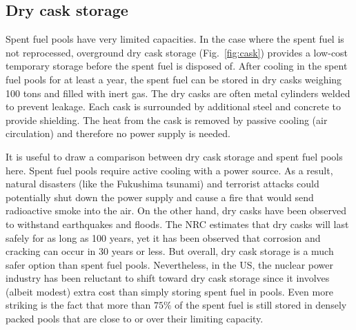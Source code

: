 \documentclass[nofootinbib,preprint,aps]{revtex4-1}
\begin{document}
    \subsection{Dry cask storage}
    Spent fuel pools have very limited capacities. 
    In the case where the spent fuel is not reprocessed, overground dry cask storage (Fig.~\ref{fig:cask}) provides a low-cost temporary storage before the spent fuel is disposed of.
    After cooling in the spent fuel pools for at least a year, the spent fuel can be stored in dry casks weighing
    100 tons and filled with inert gas. 
    The dry casks are often metal cylinders welded to prevent leakage. Each cask is surrounded by
    additional steel and concrete to provide shielding.
    The heat from the cask is removed by passive
    cooling (air circulation) and therefore no power supply is needed.

    It is useful to draw a comparison between dry cask storage and spent fuel pools here.
    Spent fuel pools require active cooling with a power source. As a result, natural disasters (like the Fukushima
    tsunami) and terrorist attacks could potentially shut down the power supply and cause a fire that would
    send radioactive smoke into the air.
    On the other hand, dry casks have been observed to withstand earthquakes and floods.
    The NRC estimates that dry casks will
    last safely for as long as 100 years, yet it has been observed that corrosion and cracking can occur in 30 years
    or less.\cite{aa12} But overall, dry cask storage is a much safer option than spent fuel pools.\cite{r14} Nevertheless, in the US, the nuclear power industry has been reluctant to shift toward dry cask storage since it
    involves (albeit modest) extra cost than simply storing spent fuel in pools.\cite{r14}
    Even more striking is the fact that more than $75\%$ of the spent fuel is still stored in densely
    packed pools
    that are close to or over their limiting capacity.\cite{a11,aa12}
\end{document}
